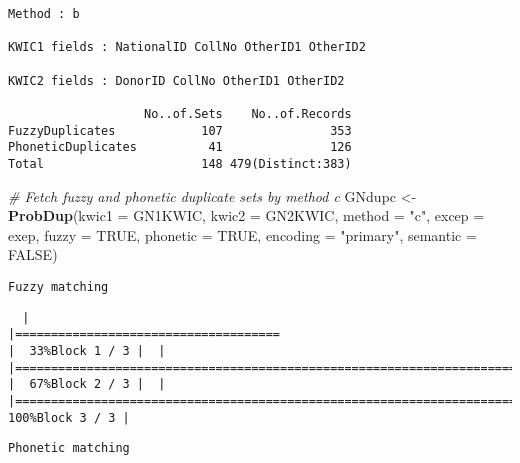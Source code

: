 \documentclass[
]{article}
\newenvironment{Shaded}{\begin{snugshade}}{\end{snugshade}}
\newcommand{\CommentTok}[1]{\textcolor[rgb]{0.56,0.35,0.01}{\textit{#1}}}
\newcommand{\DataTypeTok}[1]{\textcolor[rgb]{0.13,0.29,0.53}{#1}}
\newcommand{\KeywordTok}[1]{\textcolor[rgb]{0.13,0.29,0.53}{\textbf{#1}}}
\newcommand{\NormalTok}[1]{#1}
\newcommand{\OtherTok}[1]{\textcolor[rgb]{0.56,0.35,0.01}{#1}}
\newcommand{\StringTok}[1]{\textcolor[rgb]{0.31,0.60,0.02}{#1}}
\begin{document}
\begin{verbatim}
Method : b

KWIC1 fields : NationalID CollNo OtherID1 OtherID2

KWIC2 fields : DonorID CollNo OtherID1 OtherID2
 
                   No..of.Sets    No..of.Records
FuzzyDuplicates            107               353
PhoneticDuplicates          41               126
Total                      148 479(Distinct:383)
\end{verbatim}

\begin{Shaded}
\begin{Highlighting}[]
\CommentTok{# Fetch fuzzy and phonetic duplicate sets by method c}
\NormalTok{GNdupc <-}\StringTok{ }\KeywordTok{ProbDup}\NormalTok{(}\DataTypeTok{kwic1 =}\NormalTok{ GN1KWIC, }\DataTypeTok{kwic2 =}\NormalTok{ GN2KWIC, }\DataTypeTok{method =} \StringTok{"c"}\NormalTok{,}
                  \DataTypeTok{excep =}\NormalTok{ exep, }\DataTypeTok{fuzzy =} \OtherTok{TRUE}\NormalTok{, }\DataTypeTok{phonetic =} \OtherTok{TRUE}\NormalTok{,}
                  \DataTypeTok{encoding =} \StringTok{"primary"}\NormalTok{, }\DataTypeTok{semantic =} \OtherTok{FALSE}\NormalTok{)}
\end{Highlighting}
\end{Shaded}

\begin{verbatim}
Fuzzy matching
\end{verbatim}

\begin{verbatim}
  |                                                                                                                       |=====================================                                                                          |  33%Block 1 / 3 |  |                                                                                                                       |==========================================================================                                     |  67%Block 2 / 3 |  |                                                                                                                       |===============================================================================================================| 100%Block 3 / 3 |
\end{verbatim}

\begin{verbatim}
Phonetic matching
\end{verbatim}
\end{document}
